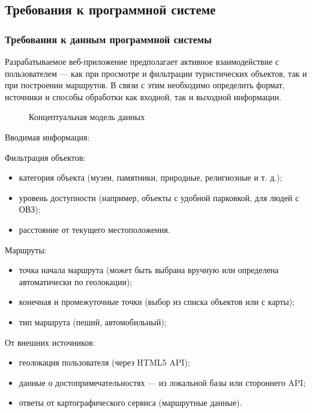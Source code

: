 \subsection{Требования к программной системе}
\subsubsection{Требования к данным программной системы}

Разрабатываемое веб-приложение предполагает активное взаимодействие с пользователем — как при просмотре и фильтрации туристических объектов, так и при построении маршрутов. В связи с этим необходимо определить формат\cite{b4}, источники и способы обработки как входной, так и выходной информации.

\begin{figure}[ht]
	\caption{Концептуальная модель данных}
	\label{comp:image}
\end{figure}

Вводимая информация:

Фильтрация объектов:
\begin{itemize}
	\item категория объекта (музеи, памятники, природные, религиозные и т. д.);
	\item уровень доступности (например, объекты с удобной парковкой, для людей с ОВЗ);
	\item расстояние от текущего местоположения.
\end{itemize}

Маршруты:
\begin{itemize}
	\item точка начала маршрута (может быть выбрана вручную или определена автоматически по геолокации);
	\item конечная и промежуточные точки (выбор из списка объектов или с карты);
	\item тип маршрута (пеший, автомобильный);
\end{itemize}

От внешних источников:
\begin{itemize}
	\item геолокация пользователя (через HTML5 API)\cite{b5};
	\item данные о достопримечательностях — из локальной базы или стороннего API;
	\item ответы от картографического сервиса (маршрутные данные).
\end{itemize}


